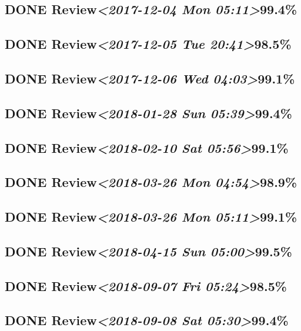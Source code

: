 \documentclass[11pt]{ctexart}
\begin{document}
\subsection{{\bfseries\sffamily DONE} Review\textit{<2017-12-04 Mon 05:11>}99.4\%}
\label{sec:org12e2705}
\subsection{{\bfseries\sffamily DONE} Review\textit{<2017-12-05 Tue 20:41>}98.5\%}
\label{sec:org78bc59d}
\subsection{{\bfseries\sffamily DONE} Review\textit{<2017-12-06 Wed 04:03>}99.1\%}
\label{sec:org4260b96}
\subsection{{\bfseries\sffamily DONE} Review\textit{<2018-01-28 Sun 05:39>}99.4\%}
\label{sec:org4c57a34}
\subsection{{\bfseries\sffamily DONE} Review\textit{<2018-02-10 Sat 05:56>}99.1\%}
\label{sec:org24c538b}
\subsection{{\bfseries\sffamily DONE} Review\textit{<2018-03-26 Mon 04:54>}98.9\%}
\label{sec:org91d06b9}
\subsection{{\bfseries\sffamily DONE} Review\textit{<2018-03-26 Mon 05:11>}99.1\%}
\label{sec:orga710889}
\subsection{{\bfseries\sffamily DONE} Review\textit{<2018-04-15 Sun 05:00>}99.5\%}
\label{sec:org990f7b7}
\subsection{{\bfseries\sffamily DONE} Review\textit{<2018-09-07 Fri 05:24>}98.5\%}
\label{sec:orgc9fa4e0}
\subsection{{\bfseries\sffamily DONE} Review\textit{<2018-09-08 Sat 05:30>}99.4\%}
\label{sec:org25cb4e1}
\end{document}
